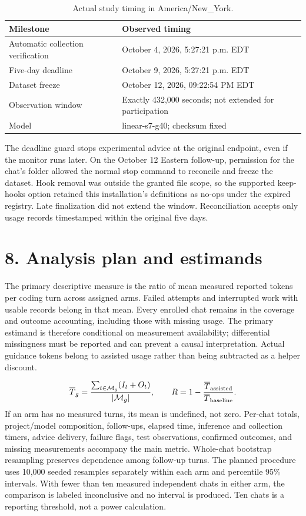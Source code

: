 \documentclass[11pt]{article}
\begin{document}
\begin{table}[htbp]
\centering
\small
\caption{Actual study timing in America/New\_York.}
\begin{tabularx}{\linewidth}{@{}XX@{}}
\toprule
Milestone & Observed timing\\
\midrule
Automatic collection verification & October 4, 2026, 5:27:21 p.m. EDT\\
Five-day deadline & October 9, 2026, 5:27:21 p.m. EDT\\
Dataset freeze & October 12, 2026, 09:22:54 PM EDT\\
Observation window & Exactly 432,000 seconds; not extended for participation\\
Model & linear-s7-g40; checksum fixed\\
\bottomrule
\end{tabularx}
\end{table}
The deadline guard stops experimental advice at the original endpoint, even if the monitor runs later. On the October 12 Eastern follow-up, permission for the chat's folder allowed the normal stop command to reconcile and freeze the dataset. Hook removal was outside the granted file scope, so the supported keep-hooks option retained this installation's definitions as no-ops under the expired registry. Late finalization did not extend the window. Reconciliation accepts only usage records timestamped within the original five days.

\section*{8. Analysis plan and estimands}
The primary descriptive measure is the ratio of mean measured reported tokens per coding turn across assigned arms. Failed attempts and interrupted work with usable records belong in that mean. Every enrolled chat remains in the coverage and outcome accounting, including those with missing usage. The primary estimand is therefore conditional on measurement availability; differential missingness must be reported and can prevent a causal interpretation. Actual guidance tokens belong to assisted usage rather than being subtracted as a helper discount.

\[
\overline T_g=\frac{\sum_{t\in\mathcal M_g}(I_t+O_t)}{|\mathcal M_g|},\qquad R=1-\frac{\overline T_{\rm assisted}}{\overline T_{\rm baseline}}.
\]
If an arm has no measured turns, its mean is undefined, not zero. Per-chat totals, project/model composition, follow-ups, elapsed time, inference and collection timers, advice delivery, failure flags, test observations, confirmed outcomes, and missing measurements accompany the main metric. Whole-chat bootstrap resampling preserves dependence among follow-up turns. The planned procedure uses 10,000 seeded resamples separately within each arm and percentile 95\% intervals. With fewer than ten measured independent chats in either arm, the comparison is labeled inconclusive and no interval is produced. Ten chats is a reporting threshold, not a power calculation.
\end{document}
